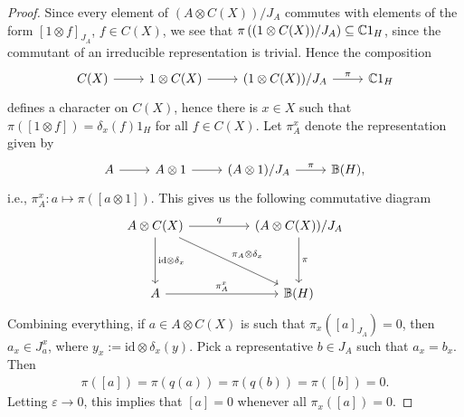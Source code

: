 \begin{proof}
	Since every element of $(A \otimes C(X))/J_A$ commutes with elements of the form $[1 \otimes f]_{J_A}$, $f \in C(X)$, we see that $\pi\left( (1 \otimes C(X))/J_A \right) \subseteq \mathbb{C} 1_H$, since the commutant of an irreducible representation is trivial. Hence the composition
	\begin{equation*}
		\begin{tikzcd}
			 C(X) \ar[r] & 1 \otimes C(X) \ar[r] & (1 \otimes C(X))/J_A \ar[r, "\pi"] & \C 1_H 
		\end{tikzcd}
	\end{equation*}
	defines a character on $C(X)$, hence there is $x \in X$ such that $\pi([1 \otimes f]) = \delta_x(f)1_H$ for all $f \in C(X)$. Let $\pi_A^x$ denote the representation given by 
	\begin{equation*}
		\begin{tikzcd}
			A \ar[r] &A \otimes 1  \ar[r] & (A \otimes 1)/J_A \ar[r, "\pi"] & \mathbb{B}(H),
		\end{tikzcd}
	\end{equation*}
	i.e., $\pi_A^x \colon a \mapsto \pi([a \otimes 1])$. This gives us the following commutative diagram
	\begin{equation*}
		\begin{tikzcd}
			A \otimes C(X) \ar[rr, "q"] \ar [dd, "\mathrm{id}\otimes \delta_x"] \ar[rrdd, "\pi_A \otimes \delta_x"] && (A \otimes C(X))/J_A \ar[dd, "\pi"]\\ 
			 & & \\
			A \ar[rr, "\pi_A^x"] && \mathbb{B}(H)
		\end{tikzcd}
	\end{equation*}
	Combining everything, if $a \in A \otimes C(X)$ is such that $\pi_x([a]_{J_A})=0$, then $a_x \in J_a^x$, where $y_x := \mathrm{id} \otimes \delta_x (y)$. Pick a representative $b \in J_A$ such that $a_x = b_x$. Then
	\begin{align*}
		\pi([a]) = \pi( q(a)) =  \pi(q(b)) = \pi([b])=0.
	\end{align*}
	Letting $\varepsilon \to 0$, this implies that $[a] = 0$ whenever all $\pi_x([a]) = 0$. 
	

\end{proof}
